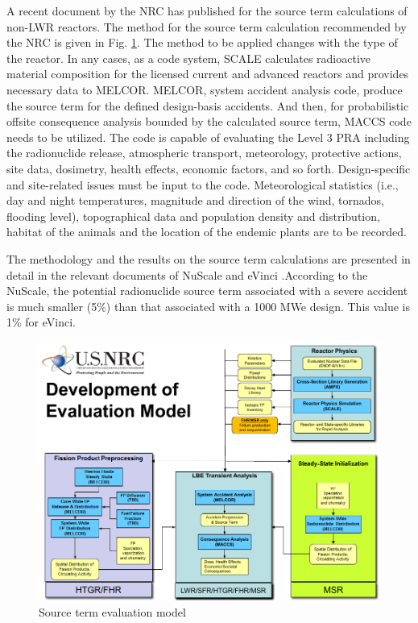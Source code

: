 \documentclass[10pt,a4paper]{article}
\begin{document}
A recent document by the NRC \cite{noauthor_nrc_2019} has published for the source term calculations of non-LWR reactors.
The method for the source term calculation recommended by the NRC is given in Fig. \ref{sourceterm}. The method to be applied changes with the type of the reactor. In any cases, as a code system, SCALE calculates radioactive material composition for the licensed current and advanced reactors and provides necessary data to MELCOR. MELCOR, system accident analysis code, produce the source term for the defined design-basis accidents. And then, for probabilistic offsite consequence analysis bounded by the calculated source term, MACCS code needs to be utilized. The code is capable of evaluating the Level 3 \gls{PRA} including the radionuclide release, atmospheric transport, meteorology, protective actions, site data, dosimetry, health effects, economic factors, and so forth. Design-specific and site-related issues must be input to the code.  Meteorological statistics (i.e., day and night temperatures, magnitude and direction of the wind, tornados, flooding level), topographical data and population density and distribution, habitat of the animals and the location of the endemic plants are to be recorded.  
 
The methodology and the results on the source term calculations are presented in detail in the relevant documents of NuScale \cite{nuscale_chapter_2018-1} and eVinci \cite{maioli_westinghouse_2019}.According to the NuScale, the potential radionuclide source term associated with a severe accident is much smaller (5\%) than that associated with a 1000 MWe design. This value is 1\% for eVinci. 

\begin{figure}[hbtp]
\centering
\includegraphics[scale=0.6]{Figs/sourceterm.jpeg}
\caption{Source term evaluation model}
\label{sourceterm}
\end{figure}
\end{document}
